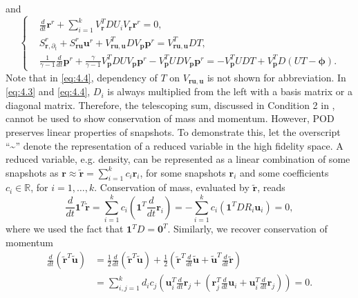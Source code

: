 and
\begin{equation} \label{eq:4.4}
\left\{
\begin{aligned}
	& \frac{d}{dt} \mathbf r^r + \sum_{i=1}^k V^T_{\mathbf r}DU_iV_{\mathbf r}\mathbf r^r = 0, \\
	& S^r_{\mathbf r ,\partial_t} + S^r _{\mathbf r \mathbf u} \mathbf u^r + V_{\mathbf r \mathbf u, \mathbf u}^T D V_{\mathbf p} \mathbf p^r = V_{\mathbf r \mathbf u, \mathbf u}^T D T, \\
	&\frac{1}{\gamma -1} \frac{d}{dt} \mathbf p^r + \frac{\gamma}{\gamma -1} V_{\mathbf p}^T D U V_{\mathbf p} \mathbf p^r - V_{\mathbf p}^T UD V_{\mathbf p} \mathbf p^r = - V_{\mathbf p}^T UDT + V_{\mathbf p}^T D(UT - \mathbf \phi).
\end{aligned}
\right.
\end{equation}
Note that in \eqref{eq:4.4}, dependency of $T$ on $V_{\mathbf r \mathbf u , \mathbf u}$ is not shown for abbreviation. In \eqref{eq:4.3} and \eqref{eq:4.4}, $D_i$ is always multiplied from the left with a basis matrix or a diagonal matrix. Therefore, the telescoping sum, discussed in Condition 2 in , cannot be used to show conservation of mass and momentum. However, POD preserves linear properties of snapshots. To demonstrate this, let the overscript ``\textasciitilde'' denote the representation of a reduced variable in the high fidelity space. A reduced variable, e.g. density, can be represented as a linear combination of some snapshots as $\mathbf r \approx \tilde{\mathbf r} = \sum_{i=1}^k c_i \mathbf r_i$, for some snapshots $\mathbf r_i$ and some coefficients $c_i \in \mathbb R$, for $i=1,\dots,k$. Conservation of mass, evaluated by $\tilde{\mathbf r}$, reads
\begin{equation} \label{eq:4.5}
	\frac{d}{dt} \mathbf 1^T \tilde {\mathbf r} = \sum_{i=1}^k c_i  \left( \mathbf 1^T \frac{d}{dt} \mathbf r_i \right) = - \sum_{i=1}^k c_i  \left( \mathbf 1^T DR_i\mathbf u_i \right) = 0,
\end{equation}
where we used the fact that $\mathbf 1^T D = \mathbf 0^T$. Similarly, we recover conservation of momentum
\begin{equation} \label{eq:4.6}
\begin{aligned}
	\frac{d}{dt}(\tilde {\mathbf r}^T \tilde{\mathbf u}) &= \frac{1}{2} \frac{d}{dt}(\tilde{\mathbf r}^T \tilde{\mathbf u}) + \frac{1}{2} \left( \tilde{ \mathbf r }^T \frac d{dt} \tilde{ \mathbf u } + \tilde {\mathbf u}^T \frac{d}{dt} \tilde {\mathbf r} \right)\\
	&= \sum_{i,j=1}^k d_i c_j \left( \mathbf u_i^T \frac{d}{dt} \mathbf r_j + \left( \mathbf r_j^T \frac d{dt} \mathbf u_i +\mathbf u_i^T \frac{d}{dt} \mathbf r_j \right)\right) = 0.\\
\end{aligned}
\end{equation}
